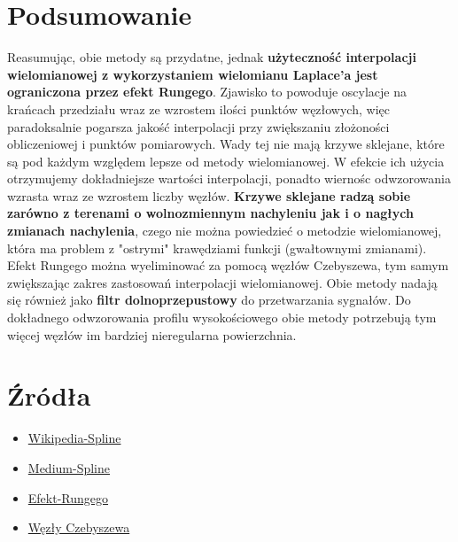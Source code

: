 \documentclass{article}
\begin{document}
\section{Podsumowanie}
Reasumując, obie metody są przydatne, jednak \textbf{użyteczność interpolacji wielomianowej z wykorzystaniem wielomianu Laplace'a jest ograniczona przez 
efekt Rungego}. Zjawisko to powoduje oscylacje na krańcach przedziału wraz ze wzrostem ilości punktów węzłowych, więc paradoksalnie pogarsza jakość interpolacji
przy zwiększaniu złożoności  obliczeniowej i punktów pomiarowych. Wady tej nie mają krzywe sklejane, które są pod każdym względem lepsze od metody wielomianowej.
W efekcie ich użycia otrzymujemy dokładniejsze wartości interpolacji, ponadto wiernośc odwzorowania wzrasta wraz ze wzrostem liczby węzłów.  \textbf{Krzywe sklejane
radzą sobie zarówno z terenami o wolnozmiennym nachyleniu jak i o nagłych zmianach nachylenia}, czego nie można powiedzieć o metodzie wielomianowej, która 
ma problem z "ostrymi" krawędziami funkcji (gwałtownymi zmianami). Efekt Rungego można wyeliminować za pomocą węzłów Czebyszewa, tym samym zwiększając
zakres zastosowań interpolacji wielomianowej. Obie metody nadają się również jako \textbf{filtr dolnoprzepustowy} do przetwarzania sygnałów.  Do dokładnego odwzorowania profilu wysokościowego obie metody potrzebują 
tym więcej węzłów im bardziej nieregularna powierzchnia.
\section{Źródła}
\begin{itemize}
	\item \href{https://en.wikipedia.org/w/index.php?title=Spline_%28mathematics%29&oldid=288288033#Algorithm_for_computing_natural_cubic_splines}{Wikipedia-Spline}
	\item \href{https://medium.com/eatpredlove/natural-cubic-splines-implementation-with-python-edf68feb57aa}{Medium-Spline}
	\item \href{https://pl.wikipedia.org/wiki/Efekt_Rungego}{Efekt-Rungego}
	\item \href{https://byc-matematykiem.pl/tajniki-interpolacji-czesc-9/}{Węzły Czebyszewa}
\end{itemize}
\end{document}
